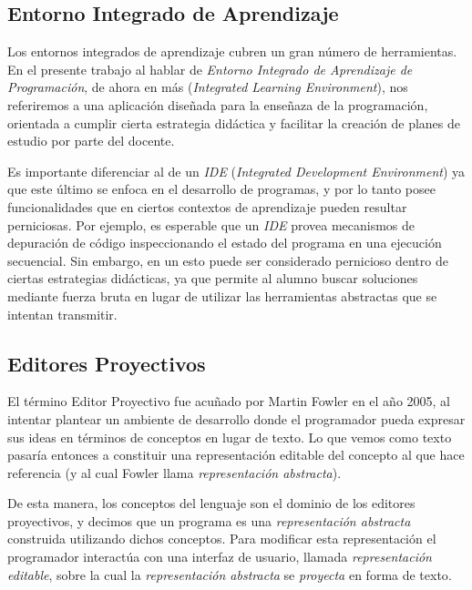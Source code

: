 \subsection{Entorno Integrado de Aprendizaje}

Los entornos integrados de aprendizaje\cite{IntegratedLearningEnvironment} cubren un gran número de herramientas. En el presente trabajo al hablar de \textit{Entorno Integrado de Aprendizaje de Programación}, de ahora en más \ile (\textit{Integrated Learning Environment}), nos referiremos a una aplicación diseñada para la enseñaza de la programación, orientada a cumplir cierta estrategia didáctica y facilitar la creación de planes de estudio por parte del docente. 

Es importante diferenciar al \ile de un \textit{IDE} (\textit{Integrated Development Environment}) ya que este último se enfoca en el desarrollo de programas, y por lo tanto posee funcionalidades que en ciertos contextos de aprendizaje pueden resultar perniciosas. Por ejemplo, es esperable que un \textit{IDE} provea mecanismos de depuración de código inspeccionando el estado del programa en una ejecución secuencial. Sin embargo, en un \ile esto puede ser considerado pernicioso dentro de ciertas estrategias didácticas, ya que permite al alumno buscar soluciones mediante fuerza bruta en lugar de utilizar las herramientas abstractas que se intentan transmitir.

\subsection{Editores Proyectivos}

El término Editor Proyectivo fue acuñado por Martin Fowler en el año 2005\cite{Fowler}, al intentar plantear un ambiente de desarrollo donde el programador pueda expresar sus ideas en términos de conceptos en lugar de texto. Lo que vemos como texto pasaría entonces a constituir una representación editable del concepto al que hace referencia (y al cual Fowler llama \textit{representación abstracta}).

De esta manera, los conceptos del lenguaje son el dominio de los editores proyectivos, y decimos que un programa es una \textit{representación abstracta} construida utilizando dichos conceptos. Para modificar esta representación el programador interactúa con una interfaz de usuario, llamada \textit{representación editable}, sobre la cual la \textit{representación abstracta} se \textit{proyecta} en forma de texto\cite{voelter2014projectional}. 



